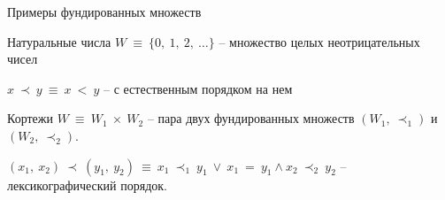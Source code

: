 \documentclass[hyperref={unicode=true}]{beamer}
\begin{document}
	\begin{frame}{Примеры фундированных множеств}
	\begin{block}{Натуральные числа}
	$W~\equiv~\{0,~1,~2,~\ldots\}$ -- множество целых неотрицательных чисел

	$x~\prec~y~\equiv~x~<~y$ -- с естественным порядком на нем
	\end{block}
	\begin{block}{Кортежи}
	$W~\equiv~W_1~\times~W_2$ -- пара двух фундированных множеств $(W_1,~\prec_1)$ и $(W_2,~\prec_2)$.

	$(x_1,~x_2)~\prec~(y_1,~y_2) ~\equiv~ x_1~\prec_1~y_1~\lor~x_1~=~y_1 \land x_2~\prec_2~y_2$ -- лексикографический порядок.
	\end{block}
	\end{frame}
\end{document}
